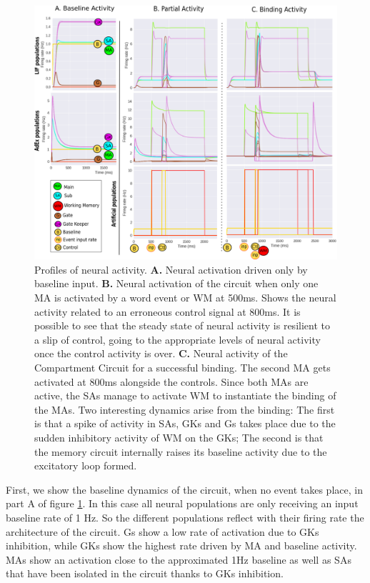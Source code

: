 \documentclass[10pt]{article}
\begin{document}
\begin{figure}[h!]
  \begin{center}
    \includegraphics[width=1.0\columnwidth]{figures/compartment_circuit_dynamics}
    \caption{Profiles of neural activity.
      \textbf{A.} Neural activation driven only by baseline input. \textbf{B.} Neural activation of the circuit when only one MA is activated by a word event or WM at 500ms.
      Shows the neural activity related to an erroneous control signal at 800ms.
      It is possible to see that the steady state of neural activity is resilient to a slip of control, going to the appropriate levels of neural activity once the control activity is over.
      \textbf{C.} Neural activity of the Compartment Circuit for a successful binding.
      The second MA gets activated at 800ms alongside the controls.
      Since both MAs are active, the SAs manage to activate WM to instantiate the binding of the MAs.
      Two interesting dynamics arise from the binding:
      The first is that a spike of activity in SAs, GKs and Gs takes place due to the sudden inhibitory activity of WM on the GKs;
      The second is that the memory circuit internally raises its baseline activity due to the excitatory loop formed.
    }

      \label{fig:activity_profiles}
  \end{center}
\end{figure}


First, we show the baseline dynamics of the circuit, when no event takes place, in part A of figure \ref{fig:activity_profiles}.
In this case all neural populations are only receiving an input baseline rate of 1 Hz.
So the different populations reflect with their firing rate the architecture of the circuit.
Gs show a low rate of activation due to GKs inhibition, while GKs show the highest rate driven by MA and baseline activity.
MAs show an activation close to the approximated 1Hz baseline as well as SAs that have been isolated in the circuit thanks to GKs inhibition.
\end{document}
